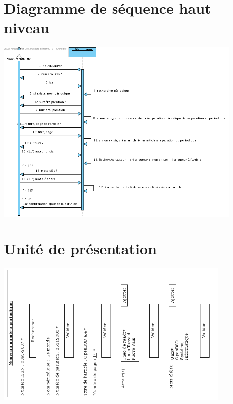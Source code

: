 \documentclass[a4paper,10pt]{report}
\begin{document}
\section*{Diagramme de séquence haut niveau}
\includegraphics[height=90mm]{NouvNumPerHautNiveau.png}

\newpage

\section*{Unité de présentation}
\includegraphics[height=70mm]{UpNouvNumPer.png}
\end{document}
